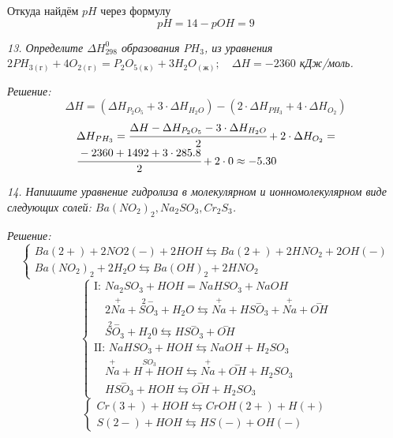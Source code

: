 Откуда найдём \( pH \) через формулу
\[
	pH = 14 - pOH = 9
\]

\pagebreak

\emph{13. Определите \( \Delta H^{0}_{298} \) образования \( PH_3\), 
из уравнения 
\(
    2PH_{3(\text{г})} + 4O_{2(\text{г})} = 
    P_2 O_{5(\text{к})} + 3H_2 O_{(\text{ж})};\quad
    \Delta H = -2360 
\) кДж/моль.}

\emph{Решение:}
\[
	\Delta H = \left( \Delta H_{P_2 O_5} + 3\cdot\Delta H_{H_2 O} \right) -
		\left( 2\cdot\Delta H_{PH_3} + 4\cdot\Delta H_{O_2} \right) 
\]
\[
	\begin{array}{ll}
		\Delta H_{PH_3} = \cfrac{ \Delta H - \Delta H_{P_2 O_5} - 
		3\cdot\Delta H_{H_2 O}}{2} + 2\cdot\Delta H_{O_2} = \\
		\cfrac{-2360 + 1492 + 3\cdot285.8}{2} + 2\cdot0 \approx -5.30 
	\end{array}
\]

\pagebreak

\emph{14. Напишите уравнение гидролиза в молекулярном и ионномолекулярном 
виде следующих солей: \( Ba(NO_2)_2, Na_2 SO_3, Cr_2 S_3 \).}

\emph{Решение:}
\[
	\left\{ \begin{array}{ll}
		Ba(2+) + 2NO2(-) + 2HOH \leftrightarrows Ba(2+) + 2HNO_2 + 2OH(-) \\ 
		Ba(NO_2)_2 + 2H_2 O \leftrightarrows Ba(OH)_2 + 2HNO_2
	\end{array} \right.
\]
\[
	\left\{ \begin{array}{ll}
		\text{I: } Na_2 SO_3 + HOH = NaHSO_3 + NaOH \\
		\quad 2\stackrel{+}{Na} + \stackrel{2-}{SO_3} + H_2 O 
			\leftrightarrows \stackrel{+}{Na} + H\stackrel{-}{SO_3} + 
			\stackrel{+}{Na} +  \stackrel{-}{OH} \\
		\quad \stackrel{2-}{SO_3} + H_2 0 \leftrightarrows 
			H\stackrel{-}{SO_3} + \stackrel{-}{OH} \\
		\text{II: } NaHSO_3 + HOH \leftrightarrows NaOH + H_2 SO_3 \\
		\quad \stackrel{+}{Na} + H\stackrel{SO_3} + HOH \leftrightarrows 
			\stackrel{+}{Na} + \stackrel{-}{OH} + H_2 SO_3 \\
		\quad H\stackrel{-}{SO_3} + HOH \leftrightarrows 
			\stackrel{-}{OH} + H_2 SO_3 
	\end{array} \right.
\]
\[
	\left\{ \begin{array}{ll}
		Cr(3+) + HOH \leftrightarrows CrOH(2+) + H(+) \\
		S(2-) + HOH \leftrightarrows HS(-) + OH(-)
	\end{array} \right.
\]

